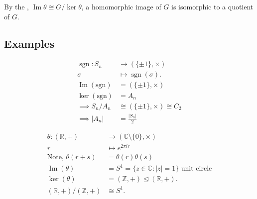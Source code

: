 \begin{remark}
  By the , $\operatorname{Im} \theta \cong G / \ker \theta$, a homomorphic image of $G$ is isomorphic to a quotient of $G$. 
\end{remark}

\hypertarget{examples}{%
\subsection{Examples}\label{examples}}

\begin{example}
\begin{align*}
    \operatorname{sgn} : S_n &\to ( \{ \pm 1 \}, \times) \\
    \sigma &\mapsto \operatorname{sgn}(\sigma). \\
    \operatorname{Im}(\text{sgn}) &= ( \{ \pm 1 \}, \times) \\
    \ker(\text{sgn}) &= A_n \\
    \implies S_n / A_n &\cong ( \{ \pm 1 \}, \times) \cong C_2 \\
    \implies |A_n| &= \frac{|S_n|}{2}
\end{align*}
\end{example}

\begin{example}
\begin{align*}
    \theta : (\mathbb{R}, +) &\to (\mathbb{C} \setminus \{ 0 \}, \times) \\
    r &\mapsto e^{2 \pi i r} \\
    \text{Note, } \theta(r + s) &= \theta(r) \theta(s) \\
    \operatorname{Im}(\theta) &= S^1 = \{ z \in \mathbb{C} : |z| = 1 \} \text{ unit circle} \\
    \ker (\theta) &= (\mathbb{Z}, +) \trianglelefteq  (\mathbb{R}, +) . \\
    (\mathbb{R}, +) / (\mathbb{Z}, +) &\cong S^1.
\end{align*}
\end{example}

